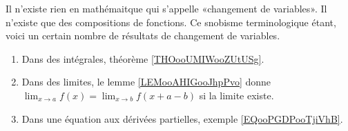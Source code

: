 
Il n'existe rien en mathémaitque qui s'appelle «changement de variables». Il n'existe que des compositions de fonctions. Ce snobisme terminologique étant, voici un certain nombre de résultats de changement de variables.
\begin{enumerate}
	\item
	      Dans des intégrales, théorème \ref{THOooUMIWooZUtUSg}.
	\item
	      Dans des limites, le lemme \ref{LEMooAHIGooJhpPvo} donne \( \lim_{x\to a} f(x)=\lim_{x\to b}f(x+a-b)\) si la limite existe.
	\item
	      Dans une équation aux dérivées partielles, exemple \ref{EQooPGDPooTjiVhB}.
\end{enumerate}

